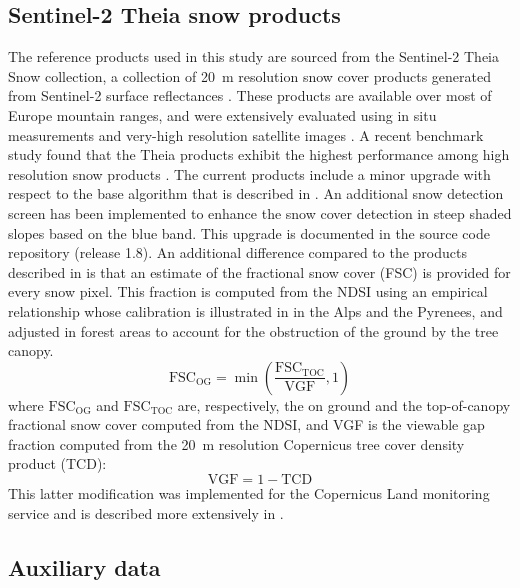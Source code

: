 \documentclass[tc, manuscript]{copernicus}
\begin{document}
\subsection{Sentinel-2 Theia snow products}
\label{subsec: data_sentinel2}
The reference products used in this study are sourced from the Sentinel-2 Theia Snow collection, a collection of 20~m resolution snow cover products generated from Sentinel-2 surface reflectances \citep{gascoin_theia_2019}. These products are available over most of Europe mountain ranges, and were extensively evaluated using in situ measurements and very-high resolution satellite images \citep{gascoin_theia_2019, barrou_dumont_brief_2021}. A recent benchmark study found that the Theia products exhibit the highest performance among high resolution snow products \citep{GARCIAGARCIA2026115131}. The current products include a minor upgrade with respect to the base algorithm that is described in \citep{gascoin_theia_2019}. An additional snow detection screen has been implemented to enhance the snow cover detection in steep shaded slopes based on the blue band. This upgrade is documented in the source code repository (release 1.8). An additional difference compared to the products described in \citep{gascoin_theia_2019} is that an estimate of the fractional snow cover (FSC) is provided for every snow pixel. This fraction is computed from the NDSI using an empirical relationship whose calibration is illustrated in \citep{gascoin_estimating_2020} in the Alps and the Pyrenees, and adjusted in forest areas to account for the obstruction of the ground by the tree canopy.
\begin{equation}
    \mathrm{FSC_{OG}} = \min(\frac{\mathrm{FSC_{TOC}}}{\mathrm{VGF}}, 1)
\end{equation}
\label{eq: fscog}
where $\mathrm{FSC_{OG}}$ and  $\mathrm{FSC_{TOC}}$ are, respectively, the on ground and the top-of-canopy fractional snow cover computed from the NDSI, and VGF is the viewable gap fraction computed from the 20~m resolution Copernicus tree cover density product (TCD):
\begin{equation}
    \mathrm{VGF} = 1 - \mathrm{TCD}
\end{equation}
\label{eq: vgf}
This latter modification was implemented for the Copernicus Land monitoring service and is described more extensively in \citep{hr-si_consortium_algorithm_2020}. 

\subsection{Auxiliary data}
\label{subsec: data_auxiliary}
\end{document}
